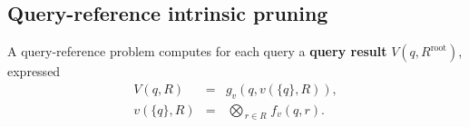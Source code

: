 \documentclass[twoside,leqno,twocolumn]{article}
\newcommand{\bigvec}[1]{\mathop{\overrightarrow{#1}}}
\newcommand{\summary}{\delta}
\newcommand{\defterm}[1]{{\bf #1}}
\newcommand{\kdroot}[1]{#1^{\text{root}}}
\newcommand{\lo}[1]{#1^{l}}
\newcommand{\up}[1]{#1^{u}}
\newcommand{\distlo}{\lo{d}}
\newcommand{\distup}{\up{d}}
\newcommand{\dist}[2]{d(#1,#2)}
\newcommand{\nameOp}[2]{\mathop{#1\nolimits\!\!_{#2}}}
\newcommand{\nameop}[2]{#1_{\!#2}}
\newcommand{\myOp}[1]{\nameOp{\bigotimes}{#1}}
\newcommand{\myop}[1]{\nameop{\otimes}{#1}}
\newcommand{\letterglob}{\psi}
\newcommand{\opglob}{\myop{\letterglob}}
\newcommand{\fglob}{f_{\letterglob}}
\newcommand{\canpruneglob}{C_{\letterglob}}
\newcommand{\deltaglob}{\summary_{\letterglob}}
\newcommand{\letterqr}{v}
\newcommand{\outqr}{V}
\newcommand{\Opqr}{\myOp{\letterqr}}
\newcommand{\fqr}{f_{\letterqr}}
\newcommand{\gqr}{g_{\letterqr}}
\newcommand{\inqrv}{v}
\newcommand{\letterstat}{s}
\newcommand{\outstat}{\sigma}
\newcommand{\opstat}{\myop{\letterstat}}
\newcommand{\fstat}{f_{\letterstat}}
\begin{document}
%


\subsection{Query-reference intrinsic pruning}
A query-reference problem computes for each query a \defterm{query result} $\outqr(q, \kdroot{R})$, expressed
\begin{eqnarray}
\outqr(q, R) &=& \gqr(q, \inqrv(\{q\}, R)),
\\
\inqrv(\{q\}, R) &=& \Opqr_{r \in R} \fqr(q, r).
\label{eqn:qrdef}
\end{eqnarray}
\end{document}
